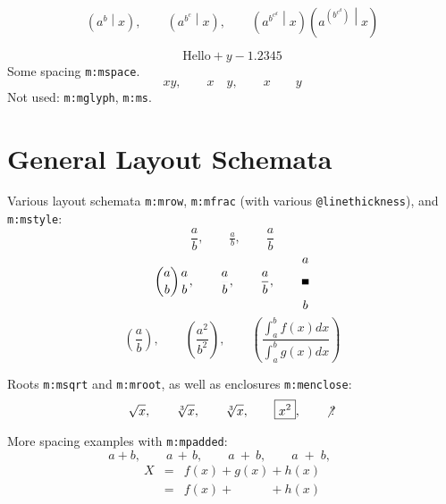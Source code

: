 \documentclass{article}
\makeatletter
\newcommand{\mml}[1]{\texttt{m:#1}}
\newcommand{\attr}[1]{\texttt{@#1}}
\makeatother
\begin{document}
\begin{equation}
\left( a^{b}  \middle| x \right),\qquad
\left( a^{b^{c}} \middle| x \right),\qquad
\left( a^{b^{c^{d}}} \middle| x \right)
\left( a^{\left(b^{c^{d}}\right)} \middle| x \right)
\end{equation}

\begin{equation}
 \mbox{Hello} + y - 1.2345
\end{equation}
Some spacing \mml{mspace}.
\begin{equation}
  xy,\qquad
  x \hspace{1em} y,\qquad
  x \hspace{2em} y
\end{equation}
Not used: \mml{mglyph}, \mml{ms}.

\section{General Layout Schemata}
Various layout schemata \mml{mrow}, \mml{mfrac} (with various \attr{linethickness}),
and \mml{mstyle}:
\begin{equation}
 \frac{a}{b},\qquad
 \tfrac{a}{b},\qquad
 \dfrac{a}{b} 
\end{equation}
\begin{equation} 
 \binom{a}{b} 
 \genfrac{}{}{0.0ex}{}{a}{b},\qquad
 \genfrac{}{}{0.01ex}{}{a}{b},\qquad
 \genfrac{}{}{0.1ex}{}{a}{b},\qquad
 \genfrac{}{}{1ex}{}{a}{b}
\end{equation}
\begin{equation} 
 \genfrac{(}{)}{}{}{a}{b},\qquad
 \genfrac{(}{)}{}{}{a^2}{b^2},\qquad
 \genfrac{(}{)}{}{}{\int_a^b f(x)dx}{\int_a^b g(x)dx} 
\end{equation}

Roots \mml{msqrt} and \mml{mroot}, as well as enclosures \mml{menclose}:
\begin{equation}
 \sqrt{x},\qquad
 \sqrt[3]{x},\qquad
 \root 3 \of {x},\qquad
 \boxed{x^2},\qquad
 \not{?} 
\end{equation}


More spacing examples with \mml{mpadded}:
\begin{equation}
  a+b, \qquad
  a \,+\, b, \qquad
  a \>+\> b, \qquad
  a \;+\; b, \qquad
\end{equation}
\begin{eqnarray}
  X &=& f(x) + g(x) + h(x) \\
    &=& f(x) + \phantom{g(x)} + h(x) \\
\end{eqnarray}
\end{document}
